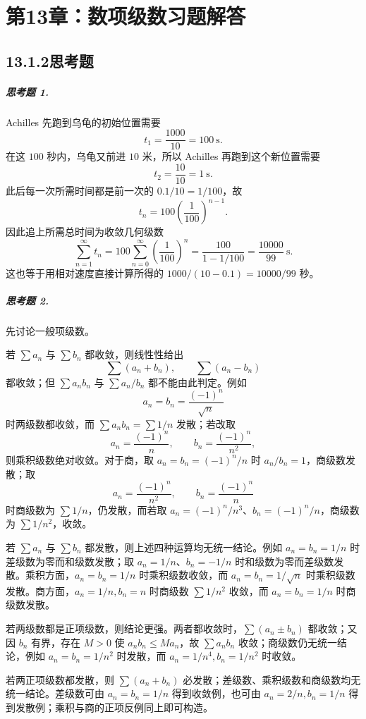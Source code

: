 ﻿%

\chapter*{第13章：数项级数习题解答}
\section*{13.1.2\quad 思考题}

\paragraph{思考题 1.}
\begin{xsolution}
Achilles 先跑到乌龟的初始位置需要
\[
 t_1=\frac{1000}{10}=100\ \text{s}.
\]
在这 $100$ 秒内，乌龟又前进 $10$ 米，所以 Achilles 再跑到这个新位置需要
\[
 t_2=\frac{10}{10}=1\ \text{s}.
\]
此后每一次所需时间都是前一次的 $0.1/10=1/100$，故
\[
 t_n=100\left(\frac1{100}\right)^{n-1}.
\]
因此追上所需总时间为收敛几何级数
\[
 \sum_{n=1}^{\infty}t_n
 =100\sum_{n=0}^{\infty}\left(\frac1{100}\right)^n
 =\frac{100}{1-1/100}
 =\frac{10000}{99}\ \text{s}.
\]
这也等于用相对速度直接计算所得的 $1000/(10-0.1)=10000/99$ 秒。
\end{xsolution}

\paragraph{思考题 2.}
\begin{xsolution}
先讨论一般项级数。

若 $\sum a_n$ 与 $\sum b_n$ 都收敛，则线性性给出
\[
 \sum(a_n+b_n),\qquad \sum(a_n-b_n)
\]
都收敛；但 $\sum a_nb_n$ 与 $\sum a_n/b_n$ 都不能由此判定。例如
\[
 a_n=b_n=\frac{(-1)^n}{\sqrt n}
\]
时两级数都收敛，而 $\sum a_nb_n=\sum 1/n$ 发散；若改取
\[
 a_n=\frac{(-1)^n}{n},\qquad b_n=\frac{(-1)^n}{n^2},
\]
则乘积级数绝对收敛。对于商，取 $a_n=b_n=(-1)^n/n$ 时 $a_n/b_n=1$，商级数发散；取
\[
 a_n=\frac{(-1)^n}{n^2},\qquad b_n=\frac{(-1)^n}{n}
\]
时商级数为 $\sum1/n$，仍发散，而若取 $a_n=(-1)^n/n^3$、$b_n=(-1)^n/n$，商级数为 $\sum1/n^2$，收敛。

若 $\sum a_n$ 与 $\sum b_n$ 都发散，则上述四种运算均无统一结论。例如 $a_n=b_n=1/n$ 时差级数为零而和级数发散；取 $a_n=1/n$、$b_n=-1/n$ 时和级数为零而差级数发散。乘积方面，$a_n=b_n=1/n$ 时乘积级数收敛，而 $a_n=b_n=1/\sqrt n$ 时乘积级数发散。商方面，$a_n=1/n,b_n=n$ 时商级数 $\sum1/n^2$ 收敛，而 $a_n=b_n=1/n$ 时商级数发散。

若两级数都是正项级数，则结论更强。两者都收敛时，$\sum(a_n\pm b_n)$ 都收敛；又因 $b_n$ 有界，存在 $M>0$ 使 $a_nb_n\leq Ma_n$，故 $\sum a_nb_n$ 收敛；商级数仍无统一结论，例如 $a_n=b_n=1/n^2$ 时发散，而 $a_n=1/n^4,b_n=1/n^2$ 时收敛。

若两正项级数都发散，则 $\sum(a_n+b_n)$ 必发散；差级数、乘积级数和商级数均无统一结论。差级数可由 $a_n=b_n=1/n$ 得到收敛例，也可由 $a_n=2/n,b_n=1/n$ 得到发散例；乘积与商的正项反例同上即可构造。
\end{xsolution}

